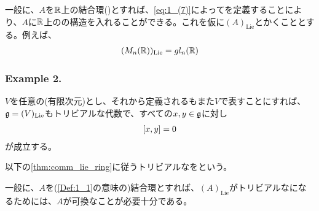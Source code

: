 \documentclass[../main]{subfiles}
\begin{document}
\begin{named}
  一般に、$A$を$\mathbb{R}$上の結合環()とすれば、\eqref{eq:1_(7)}によってを定義することにより、$A$に$\mathbb{R}$上の{}の構造を入れることができる。これを仮に$(A)_\mathrm{Lie}$とかくこととする。例えば、
  \begin{align*}
    (M_n(\mathbb{R}))_\mathrm{Lie}=gl_n(\mathbb{R})
  \end{align*}
\end{named}

\subsubsection*{Example 2.}\label{ex:2}
\begin{remark}
  $V$を任意の(有限次元)とし、それから定義されるもまた$V$で表すことにすれば、$\mathfrak{g}=(V)_\mathrm{Lie}$もトリビアルな代数で、すべての$x,y\in\mathfrak{g}$に対し
  \begin{align*}
    \comm{x}{y}=0
  \end{align*}が成立する。
\end{remark}
\begin{named}
  以下の\cref{thm:comm_lie_ring}に従うトリビアルな{}をという。
\end{named}
\begin{theorem}[可換なリー環]\label{thm:comm_lie_ring}
  一般に、$A$を(\cref{Def:1_1}の意味の)結合環とすれば、$(A)_\mathrm{Lie}$がトリビアルな{}になるためには、$A$が可換なことが必要十分である。
\end{theorem}
\end{document}
